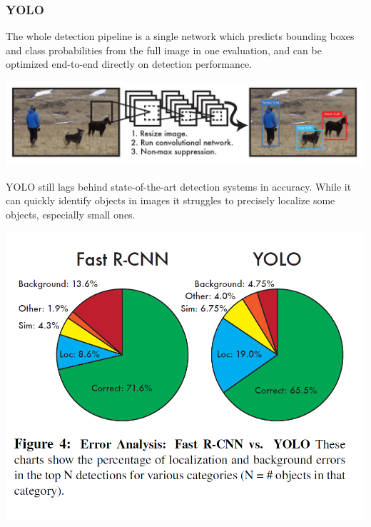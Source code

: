 \begin{frame}[allowframebreaks]
\frametitle{YOLO}


\bigskip 

The whole detection pipeline is a single network which predicts bounding boxes and class probabilities from the full image in one evaluation, and can be optimized end-to-end directly on detection performance. 

\medskip 

\begin{center}
	\includegraphics[scale=0.6]{figs/YOLO_structure}
\end{center}



\framebreak


YOLO still lags behind state-of-the-art detection systems
in accuracy. While it can quickly identify objects in images
it struggles to precisely localize some objects, especially
small ones.


\begin{center}
	\includegraphics[scale=0.6]{figs/error_YOLO_RCNN}
\end{center}




\end{frame}
